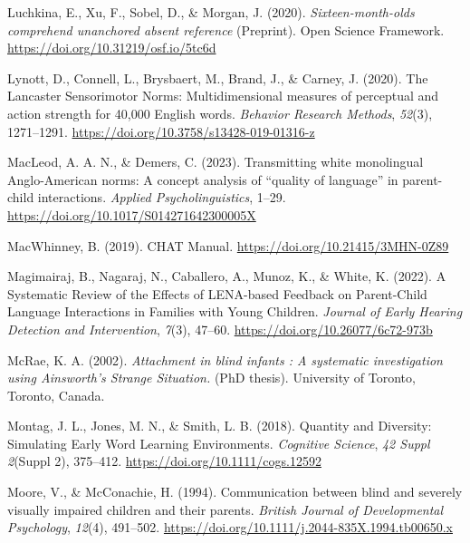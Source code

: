 \documentclass[
  man,floatsintext]{apa6}
\newlength{\cslhangindent}
\newlength{\cslentryspacingunit} %
\newenvironment{CSLReferences}[2] %
 {%
  \setlength{\parindent}{0pt}
  \ifodd #1
  \let\oldpar\par
  \def\par{\hangindent=\cslhangindent\oldpar}
  \fi
  \setlength{\parskip}{#2\cslentryspacingunit}
 }%
 {}
\begin{document}
\begin{CSLReferences}{1}{0}
\leavevmode{}%
Luchkina, E., Xu, F., Sobel, D., \& Morgan, J. (2020). \emph{Sixteen-month-olds comprehend unanchored absent reference} (Preprint). {Open Science Framework}. \url{https://doi.org/10.31219/osf.io/5tc6d}

\leavevmode{}%
Lynott, D., Connell, L., Brysbaert, M., Brand, J., \& Carney, J. (2020). The {Lancaster Sensorimotor Norms}: Multidimensional measures of perceptual and action strength for 40,000 {English} words. \emph{Behavior Research Methods}, \emph{52}(3), 1271--1291. \url{https://doi.org/10.3758/s13428-019-01316-z}

\leavevmode{}%
MacLeod, A. A. N., \& Demers, C. (2023). Transmitting white monolingual {Anglo-American} norms: {A} concept analysis of {``quality of language''} in parent-child interactions. \emph{Applied Psycholinguistics}, 1--29. \url{https://doi.org/10.1017/S014271642300005X}

\leavevmode{}%
MacWhinney, B. (2019). {CHAT Manual}. \url{https://doi.org/10.21415/3MHN-0Z89}

\leavevmode{}%
Magimairaj, B., Nagaraj, N., Caballero, A., Munoz, K., \& White, K. (2022). A {Systematic Review} of the {Effects} of {LENA-based Feedback} on {Parent-Child Language Interactions} in {Families} with {Young Children}. \emph{Journal of Early Hearing Detection and Intervention}, \emph{7}(3), 47--60. \url{https://doi.org/10.26077/6c72-973b}

\leavevmode{}%
McRae, K. A. (2002). \emph{Attachment in blind infants : A systematic investigation using {Ainsworth}'s {Strange Situation}.} (PhD thesis). University of Toronto, {Toronto, Canada}.

\leavevmode{}%
Montag, J. L., Jones, M. N., \& Smith, L. B. (2018). Quantity and {Diversity}: {Simulating Early Word Learning Environments}. \emph{Cognitive Science}, \emph{42 Suppl 2}(Suppl 2), 375--412. \url{https://doi.org/10.1111/cogs.12592}

\leavevmode{}%
Moore, V., \& McConachie, H. (1994). Communication between blind and severely visually impaired children and their parents. \emph{British Journal of Developmental Psychology}, \emph{12}(4), 491--502. \url{https://doi.org/10.1111/j.2044-835X.1994.tb00650.x}


\end{CSLReferences}
\end{document}
